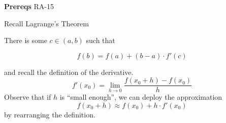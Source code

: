 

\textbf{Prereqs} RA-15

Recall Lagrange's Theorem
\begin{SNP}{\thm}There is some $c \in (a, b)$ such that\end{SNP}\begin{equation}f(b) = f(a) + (b - a)\cdot f'(c)\end{equation}

and recall the definition of the derivative.
$$
f'(x_0) = \lim_{h \to 0}\frac{f(x_0 + h) - f(x_0)}{h}
$$
Observe that if $h$ is ``small enough'', we can deploy the approximation
\begin{equation}
f(x_0 + h) \approx f(x_0) + h\cdot f'(x_0)
\end{equation}
by rearranging the definition.

